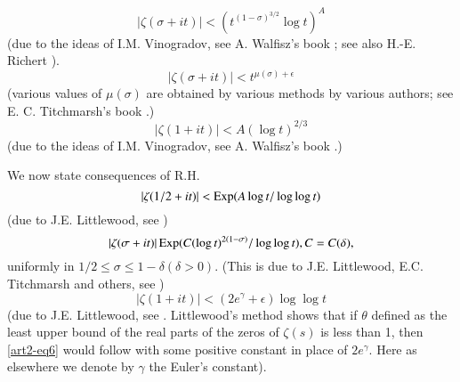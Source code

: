 \begin{equation}
|\zeta(\sigma + it)| < (t^{(1-\sigma)^{3/2}} \log t)^A \label{art2-eq2}
\end{equation}\pageoriginale
(due to the ideas of I.M. Vinogradov, see A. Walfisz's book \cite{art2-key20}; see also H.-E. Richert \cite{art2-key18}).
\begin{equation*}
|\zeta(\sigma + it)| < t^{\mu(\sigma) +\epsilon}
\tag{2$'$}\label{art2-eq2'}
\end{equation*}
(various values of $\mu(\sigma)$ are obtained by various methods by various authors; see E. C. Titchmarsh's book \cite{art2-key19}.)
\begin{equation}
|\zeta(1+it)| < A( \log t)^{2/3} \label{art2-eq3}
\end{equation}
(due to the ideas of I.M. Vinogradov, see A. Walfisz's book \cite{art2-key20}.)

We now state consequences of R.H.
\begin{equation}
|\zeta(1/2 + it)| < \operatorname{Exp} (A \log t /\log\log t) \label{art2-eq4}
\end{equation}
(due to J.E. Littlewood, see \cite{art2-key19})
\begin{equation}
|\zeta (\sigma + it)| \operatorname{Exp} (C (\log t)^{2(1-\sigma)}/ \log \log t),C = C (\delta),
\label{art2-eq5}
\end{equation}
uniformly in $1/2 \leqslant \sigma \leqslant 1 -\delta (\delta > 0)$. (This is due to J.E. Littlewood, E.C. Titchmarsh and others, see \cite{art2-key19})
\begin{equation}
|\zeta(1+it)| < (2e^\gamma+ \epsilon) \log \log t\label{art2-eq6}
\end{equation}
(due to J.E. Littlewood, see \cite{art2-key19}. Littlewood's method shows that if $\theta$ defined as the least upper bound of the real parts of the zeros of $\zeta(s)$ is less than 1, then \eqref{art2-eq6} would follow with some positive constant in place of $2e^\gamma$. Here as elsewhere we denote by $\gamma$ the Euler's constant).

